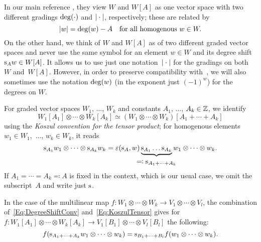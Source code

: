 \documentclass[\MainFolder/Text.tex]{subfiles}
\begin{document}
In our main reference \cite{Cieliebak2015}, they view $W$ and $W[A]$ as one vector space with two different gradings $\operatorname{deg}(\cdot)$ and $|\cdot|$, respectively; these are related by
\begin{equation*}
|w| = \operatorname{deg}(w) - A \quad\text{for all homogenous }w\in W. 
\end{equation*}
On the other hand, we think of $W$ and $W[A]$ as of two different graded vector spaces and never use the same symbol for an element $w\in W$ and its degree shift $\mathrm{s}_A w \in W[A]$. %
It allows us to use just one notation~$|\cdot|$ for the gradings on both~$W$ and~$W[A]$. However, in order to preserve compatibility with~\cite{Cieliebak2015}, we will also sometimes use the notation $\operatorname{deg}(w)$ (in the exponent just $(-1)^w$) for the degrees on $W$.

For graded vector spaces $W_1$, $\dotsc$, $W_k$ and constants $A_1$, $\dotsc$, $A_k\in \mathbb{Z}$, we identify 
\[ W_1[A_1]\otimes \dotsb \otimes W_k[A_k] \simeq (W_1\otimes \dotsb \otimes W_k)[A_1+\dotsb+A_k] \] using the \emph{Koszul convention for the tensor product}; for homogenous elements $w_1 \in W_1$,~$\dotsc$, $w_k \in W_k$, it reads
\begin{equation} \label{Eq:KoszulTensor}
\Susp_{A_1} w_1 \otimes \dotsb \otimes \Susp_{A_k} w_k = \varepsilon(\Susp_A,w) \underbrace{\Susp_{A_1}\dots\Susp_{A_k}}_{\displaystyle \mathclap{\eqqcolon \Susp_{A_1 + \dotsb + A_k}}\rule{0ex}{2ex}} w_1 \otimes \dotsb \otimes w_k.
\end{equation}
If $A_1 = \dotsb = A_k \eqqcolon A$ is fixed in the context, which is our usual case, we omit the subscript~$A$ and write just $\mathrm{s}$.

In the case of the multilinear map $f: W_1\otimes \dotsb \otimes W_k \rightarrow V_1\otimes \dotsb \otimes V_l$, the combination of~\eqref{Eq:DegreeShiftConv} and~\eqref{Eq:KoszulTensor} gives for $f: W_1[A_1]\otimes \dotsb\otimes W_k[A_k] \rightarrow V_1[B_1]\otimes \dotsb\otimes V_l[B_l]$ the following:
\begin{equation}\label{Eq:DegreeShiftConvII}
 f(\mathrm{s}_{A_1 +\dotsb + A_k} w_1 \otimes \dotsb \otimes w_k) = \mathrm{s}_{B_1 + \dotsb + B_l} f(w_1 \otimes \dotsb \otimes w_k).
\end{equation}
\end{document}
